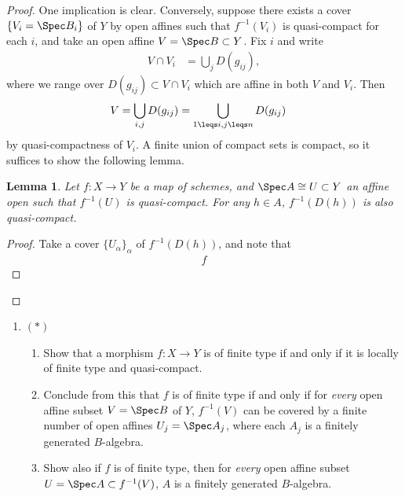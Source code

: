 \documentclass[12pt]{amsart}
\newtheorem*{lemma}{Lemma}
\begin{document}
 \begin{proof}
   One implication is clear.
   Conversely, suppose there exists a cover $\{V_i=\Spec B_i\}$ of $Y$ by open affines such that $f^{-1}(V_i)$ is quasi-compact for each $i$, and take an open affine $V=\Spec B\subset Y$.
   Fix $i$ and write 
   \begin{align*}
     V\cap V_i&= \bigcup_j D(g_{ij}),
   \end{align*}
   where we range over $D(g_{ij})\subset V\cap V_i$ which are affine in both $V$ and $V_i$.
   Then
   \begin{align*}
     V&= \bigcup_{i,j}D(g_{ij}) = \bigcup_{1\leqs i,j\leqs n}D(g_{ij})
   \end{align*}
   by quasi-compactness of $V_i$.
   A finite union of compact sets is compact, so it suffices to show the following lemma.%

   \begin{lemma}
     Let $f:X\to Y$ be a map of schemes, and $\Spec A\cong U\subset Y$ an affine open such that $f^{-1}(U)$ is quasi-compact.
     For any $h\in A$, $f^{-1}(D(h))$ is also quasi-compact.
   \end{lemma}

   \begin{proof}
     Take a cover $\{U_\alpha\}_\alpha$ of $f^{-1}(D(h))$, and note that
     \begin{align*}
       f
     \end{align*}
   \end{proof}
 \end{proof}
 
 \begin{enumerate}
 	\item[3.3.] {
       $(*)$
       \begin{enumerate}
         \item Show that a morphism $f:X\to Y$ is of finite type if and only if it is locally of finite type and quasi-compact.
         \item Conclude from this that $f$ is of finite type if and only if for \emph{every} open affine subset $V=\Spec B$ of $Y$, $f^{-1}(V)$ can be covered by a finite number of open affines $U_j=\Spec A_j$, where each $A_j$ is a finitely generated $B$-algebra.
         \item Show also if $f$ is of finite type, then for \emph{every} open affine subset $U=\Spec A\subset f^{-1}(V)$, $A$ is a finitely generated $B$-algebra.
       \end{enumerate}
     }
 \end{enumerate}
 
\end{document}
